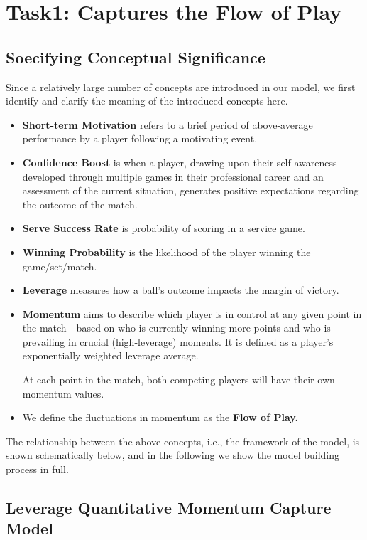 \documentclass{mcmthesis}
\begin{document}
\section{Task1: Captures the Flow of Play}
\subsection{Soecifying Conceptual Significance}
Since a relatively large number of concepts are introduced in our model, we first identify
and clarify the meaning of the introduced concepts here.
\begin{itemize}
  \item \textbf{Short-term Motivation} refers to a brief period of above-average performance by a player
  following a motivating event.
  \item \textbf{Confidence Boost} is when a player, drawing upon their self-awareness developed through
  multiple games in their professional career and an assessment of the current situation,
  generates positive expectations regarding the outcome of the match.
  \item \textbf{Serve Success Rate} is probability of scoring in a service game.
  \item \textbf{Winning Probability} is the likelihood of the player winning the game/set/match.
  \item \textbf{Leverage} measures how a ball’s outcome impacts the margin of victory.
  \item \textbf{Momentum} aims to describe which player is in control at any given point in the
  match—based on who is currently winning more points and who is prevailing in crucial
  (high-leverage) moments. It is defined as a player’s exponentially weighted leverage
  average.\par
  At each point in the match, both competing players will have their own momentum values.
  \item We define the fluctuations in momentum as the \textbf{Flow of Play.}
\end{itemize}
The relationship between the above concepts, i.e., the framework of the model, 
is shown schematically below, and in the following we show the model building process in full.
\subsection{Leverage Quantitative Momentum Capture Model}
\end{document}
